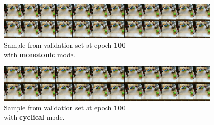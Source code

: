     \begin{figure}[H]
        \centering
        \includegraphics[scale=0.5]{img/100_mono.png}
        \caption{Sample from validation set at epoch \textbf{100}\\with \textbf{monotonic} mode.}
    \end{figure}
    \begin{figure}[H]
        \centering
        \includegraphics[scale=0.5]{img/100_cyc.png}
        \caption{Sample from validation set at epoch \textbf{100}\\with \textbf{cyclical} mode.}
    \end{figure}

	